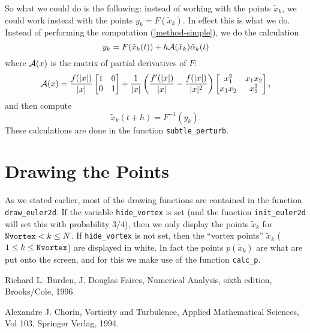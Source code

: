 \documentclass[12pt]{article}
\begin{document}
So what we could do is the following: instead of working with
the points $\tilde x_k$, we could work instead with the points
$y_k = F(\tilde x_k)$.  In effect this is what we do.
Instead of performing the computation (\ref{method-simple}),
we do the calculation
\begin{equation*}
y_k = F(\tilde x_k(t)) + h {\cal A}(\tilde x_k) \tilde\alpha_k(t) 
\end{equation*}
where
${\cal A}(x)$ is the matrix of partial derivatives of $F$:
\begin{equation*}
{\cal A}(x) = 
\frac{f(|x|)}{|x|}
\left[
\begin{matrix}
1 & 0\\
0 & 1
\end{matrix}
\right]
+ \frac1{|x|}
  \left(\frac{f'(|x|)}{|x|} - \frac{f(|x|)}{|x|^2}\right)
\left[
\begin{matrix}
x_{1}^2   & x_{1} x_{2}\\
x_{1} x_{2} & x_{2}^2
\end{matrix}
\right],
\end{equation*}
and then compute
\begin{equation*}
\tilde x_k(t+h) = F^{-1}(y_k).
\end{equation*}
These calculations are done in the function {\tt subtle\_perturb}.

\section{Drawing the Points}

As we stated earlier, most of the drawing functions are contained
in the function {\tt draw\_euler2d}.  If the variable 
{\tt hide\_vortex} is set (and the function {\tt init\_euler2d}
will set this with probability $3/4$), then we only display
the points $\tilde x_k$ for ${\tt Nvortex} < k \le N$.  If 
{\tt hide\_vortex} is not set, then the ``vortex points''
$\tilde x_k$ ($1 \le k \le {\tt Nvortex}$) are displayed in white.
In fact the points $p(\tilde x_k)$ are what are put onto the screen,
and for this we make use of the function {\tt calc\_p}.

\begin{thebibliography}{9}

 Richard L. Burden, J. Douglas Faires, Numerical Analysis,
sixth edition, Brooks/Cole, 1996.

 Alexandre J. Chorin, Vorticity and Turbulence,
Applied Mathematical Sciences, Vol 103, Springer Verlag, 1994.

\end{thebibliography}
\end{document}

